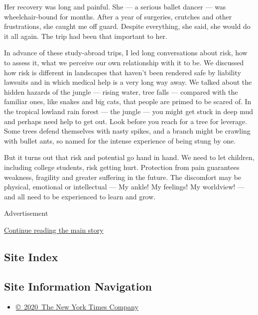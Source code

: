 Her recovery was long and painful. She --- a serious ballet dancer ---
was wheelchair-bound for months. After a year of surgeries, crutches and
other frustrations, she caught me off guard. Despite everything, she
said, she would do it all again. The trip had been that important to
her.

In advance of these study-abroad trips, I led long conversations about
risk, how to assess it, what we perceive our own relationship with it to
be. We discussed how risk is different in landscapes that haven't been
rendered safe by liability lawsuits and in which medical help is a very
long way away. We talked about the hidden hazards of the jungle ---
rising water, tree falls --- compared with the familiar ones, like
snakes and big cats, that people are primed to be scared of. In the
tropical lowland rain forest --- the jungle --- you might get stuck in
deep mud and perhaps need help to get out. Look before you reach for a
tree for leverage. Some trees defend themselves with nasty spikes, and a
branch might be crawling with bullet ants, so named for the intense
experience of being stung by one.

But it turns out that risk and potential go hand in hand. We need to let
children, including college students, risk getting hurt. Protection from
pain guarantees weakness, fragility and greater suffering in the future.
The discomfort may be physical, emotional or intellectual --- My ankle!
My feelings! My worldview! --- and all need to be experienced to learn
and grow.

Advertisement

\protect\hyperlink{after-bottom}{Continue reading the main story}

\hypertarget{site-index}{%
\subsection{Site Index}\label{site-index}}

\hypertarget{site-information-navigation}{%
\subsection{Site Information
Navigation}\label{site-information-navigation}}

\begin{itemize}
\tightlist
\item
  \href{https://help.nytimes.com/hc/en-us/articles/115014792127-Copyright-notice}{©~2020~The
  New York Times Company}
\end{itemize}

